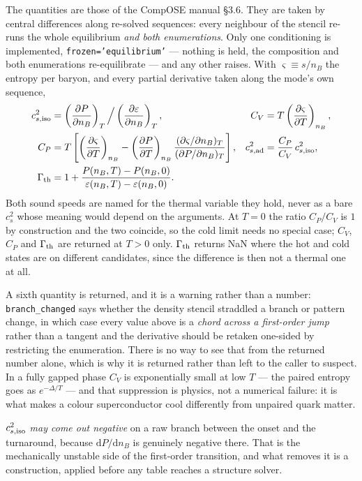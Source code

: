 \documentclass[11pt,a4paper]{article}
\newcommand{\code}[1]{\texttt{#1}}
\begin{document}
The quantities are those of the CompOSE manual \cite{TypelCompOSE2015}
\S3.6. They are taken by central differences along re-solved sequences:
every neighbour of the stencil re-runs the whole equilibrium \emph{and both
enumerations}. Only one conditioning is implemented, \code{frozen='equilibrium'}
--- nothing is held, the composition and both enumerations re-equilibrate ---
and any other raises. With $\varsigma\equiv s/n_B$ the entropy per baryon, and
every partial derivative taken along the mode's own sequence,
\begin{align}
c_{s,\rm iso}^2 &= \left(\frac{\partial P}{\partial n_B}\right)_T
 \Big/ \left(\frac{\partial\varepsilon}{\partial n_B}\right)_T,
&
C_V &= T\left(\frac{\partial\varsigma}{\partial T}\right)_{n_B},
\\
C_P &= T\left[\left(\frac{\partial\varsigma}{\partial T}\right)_{n_B}
 - \left(\frac{\partial P}{\partial T}\right)_{n_B}
 \frac{(\partial\varsigma/\partial n_B)_T}{(\partial P/\partial n_B)_T}\right],
&
c_{s,\rm ad}^2 &= \frac{C_P}{C_V}\,c_{s,\rm iso}^2,
\\
\Gamma_{\rm th} &= 1 + \frac{P(n_B,T)-P(n_B,0)}
 {\varepsilon(n_B,T)-\varepsilon(n_B,0)}. & &
\end{align}
Both sound speeds are named for the thermal variable they hold, never as a
bare $c_s^2$ whose meaning would depend on the arguments. At $T=0$ the ratio
$C_P/C_V$ is $1$ by construction and the two coincide, so the cold limit needs
no special case; $C_V$, $C_P$ and $\Gamma_{\rm th}$ are returned at $T>0$ only.
$\Gamma_{\rm th}$ returns NaN where the hot and cold states are on different
candidates, since the difference is then not a thermal one at all.

A sixth quantity is returned, and it is a warning rather than a number:
\code{branch\_changed} says whether the density stencil straddled a branch or
pattern change, in which case every value above is a \emph{chord across a
first-order jump} rather than a tangent and the derivative should be retaken
one-sided by restricting the enumeration. There is no way to see that from the
returned number alone, which is why it is returned rather than left to the
caller to suspect. In a fully gapped phase $C_V$ is exponentially small at low
$T$ --- the paired entropy goes as $e^{-\Delta/T}$ --- and that suppression is
physics, not a numerical failure: it is what makes a colour superconductor cool
differently from unpaired quark matter.

$c_{s,\rm iso}^2$ \emph{may come out negative} on a raw branch between the
onset and the turnaround, because $\mathrm dP/\mathrm dn_B$ is genuinely
negative there. That is the mechanically unstable side of the first-order
transition, and what removes it is a construction, applied before any table
reaches a structure solver.
\end{document}
